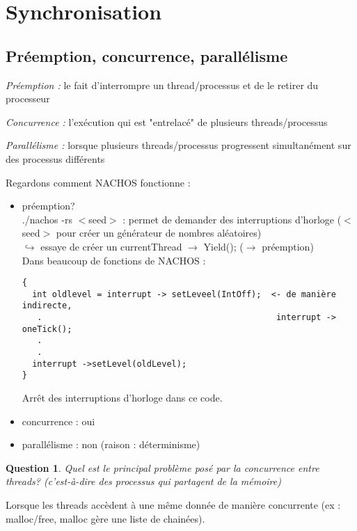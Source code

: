 \documentclass[12pt,a4paper]{report}
\newtheorem*{q}{Question}
\begin{document}
\section{Synchronisation}
\subsection{Préemption, concurrence, parallélisme}
\begin{description}
\item \textit{Préemption :} le fait d'interrompre un thread/processus et de le retirer du processeur
\item \textit{Concurrence :} l'exécution qui est "entrelacé" de plusieurs threads/processus
\item \textit{Parallélisme :} lorsque plusieurs threads/processus progressent simultanément sur des processus différents\\
\end{description}

Regardons comment NACHOS fonctionne : 
\begin{itemize}
\item préemption? \\
./nachos -rs $<$seed$>$ : permet de demander des interruptions d'horloge ($<$seed$>$ pour créer un générateur de nombres aléatoires)\\
$\hookrightarrow$ essaye de créer un currentThread $\rightarrow$ Yield(); ($\rightarrow$ préemption)\\

Dans beaucoup de fonctions de NACHOS :
\medskip
\begin{verbatim}
{ 
  int oldlevel = interrupt -> setLeveel(IntOff);  <- de manière indirecte, 
   .                                               interrupt -> oneTick();
   .
   .
  interrupt ->setLevel(oldLevel);
}
\end{verbatim}
\medskip
Arrêt des interruptions d'horloge dans ce code. \\


\item concurrence : oui
\item parallélisme : non (raison : déterminisme)\\
\end{itemize}

\begin{q} Quel est le principal problème posé par la concurrence entre threads? (c'est-à-dire des processus qui partagent de la mémoire)\end{q}
Lorsque les threads accèdent à une même donnée de manière concurrente (ex : malloc/free, malloc gère une liste de chainées).\\
\end{document}
